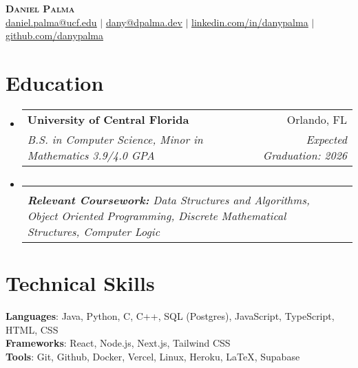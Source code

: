 \documentclass[letterpaper,11pt]{article}
\makeatletter
\newcommand{\resumeSubheading}[4]{
  \vspace{-2pt}\item
    \begin{tabular*}{0.97\textwidth}[t]{l@{\extracolsep{\fill}}r}
      \textbf{#1} & #2 \\
      \textit{\small#3} & \textit{\small #4} \\
    \end{tabular*}\vspace{-7pt}
}
\newcommand{\resumeSubHeadingListStart}{\begin{itemize}[leftmargin=0.15in, label={}]}
\newcommand{\resumeSubHeadingListEnd}{\end{itemize}}
\makeatother
\begin{document}

\begin{center}
    \textbf{\Huge \scshape Daniel Palma} \\ \vspace{1pt}
    \href{mailto:daniel.palma@ucf.edu}{\underline{daniel.palma@ucf.edu}} $|$ \href{mailto:dany@dpalma.dev}{\underline{dany@dpalma.dev}} $|$ 
    \href{https://linkedin.com/in/danypalma}{\underline{linkedin.com/in/danypalma}} $|$
    \href{https://github.com/DanyPalma}{\underline{github.com/danypalma}}
\end{center}


\section{Education}
  \resumeSubHeadingListStart
    \resumeSubheading
      {University of Central Florida}{Orlando, FL}
      {B.S. in Computer Science, Minor in Mathematics 3.9/4.0 GPA}{Expected Graduation: 2026}
    
      \vspace{-15pt}
    \resumeSubheading
      {}{}
      {\scriptsize{\textbf{Relevant Coursework: }Data Structures and Algorithms, Object Oriented Programming, Discrete Mathematical Structures, Computer Logic}}{}
  \resumeSubHeadingListEnd


\section{Technical Skills}
 \begin{itemize}[leftmargin=0.15in, label={}]
    \small{\item{
     \textbf{Languages}{: Java, Python, C, C++, SQL (Postgres), JavaScript, TypeScript, HTML, CSS} \\
     \textbf{Frameworks}{: React, Node.js, Next.js, Tailwind CSS} \\
     \textbf{Tools}{: Git, Github, Docker, Vercel, Linux, Heroku, LaTeX, Supabase} \\
    }}
 \end{itemize}
\end{document}
